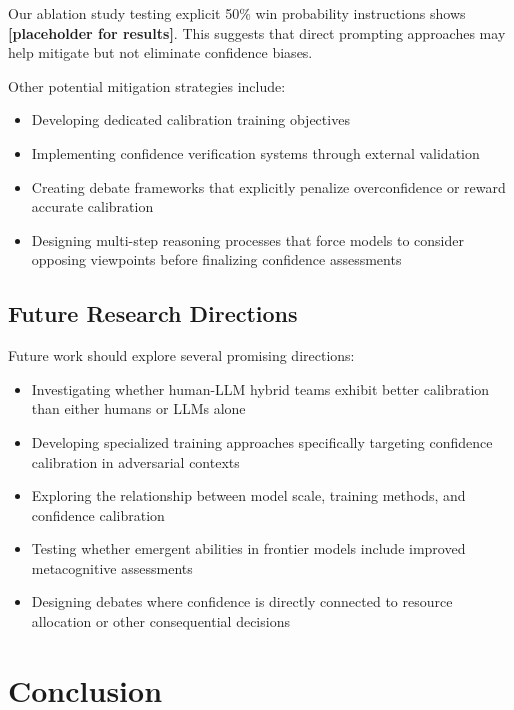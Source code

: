 \documentclass{article}
\begin{document}
Our ablation study testing explicit 50\% win probability instructions shows \textbf{[placeholder for results]}. This suggests that direct prompting approaches may help mitigate but not eliminate confidence biases.

Other potential mitigation strategies include:
\begin{itemize}
    \item Developing dedicated calibration training objectives
    \item Implementing confidence verification systems through external validation
    \item Creating debate frameworks that explicitly penalize overconfidence or reward accurate calibration
    \item Designing multi-step reasoning processes that force models to consider opposing viewpoints before finalizing confidence assessments
\end{itemize}

\subsection{Future Research Directions}

Future work should explore several promising directions:
\begin{itemize}
    \item Investigating whether human-LLM hybrid teams exhibit better calibration than either humans or LLMs alone
    \item Developing specialized training approaches specifically targeting confidence calibration in adversarial contexts
    \item Exploring the relationship between model scale, training methods, and confidence calibration
    \item Testing whether emergent abilities in frontier models include improved metacognitive assessments
    \item Designing debates where confidence is directly connected to resource allocation or other consequential decisions
\end{itemize}

\section{Conclusion}
\end{document}
